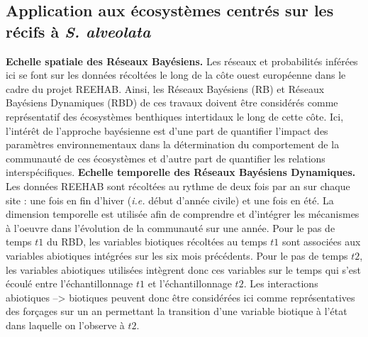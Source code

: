\documentclass[12pt]{report}
\begin{document}



        \subsection{Application aux écosystèmes centrés sur les récifs à \textit{S. alveolata}}

\textbf{Echelle spatiale des Réseaux Bayésiens.} Les réseaux et probabilités inférées ici se font sur les données récoltées le long de la côte ouest européenne dans le cadre du projet REEHAB. Ainsi, les Réseaux Bayésiens (RB) et Réseaux Bayésiens Dynamiques (RBD) de ces travaux doivent être considérés comme représentatif des écosystèmes benthiques intertidaux le long de cette côte. Ici, l'intérêt de l’approche bayésienne est d’une part de quantifier l'impact des paramètres environnementaux dans la détermination du comportement de la communauté de ces écosystèmes et d’autre part de quantifier les relations interspécifiques.
\newline \newline
\textbf{Echelle temporelle des Réseaux Bayésiens Dynamiques.} Les données REEHAB sont récoltées au rythme de deux fois par an sur chaque site : une fois en fin d’hiver (\textit{i.e.} début d’année civile) et une fois en été. La dimension temporelle est utilisée afin de comprendre et d'intégrer les mécanismes à l'oeuvre dans l'évolution de la communauté sur une année. Pour le pas de temps $t1$ du RBD, les variables biotiques récoltées au temps $t1$ sont associées aux variables abiotiques intégrées sur les six mois précédents. Pour le pas de temps $t2$, les variables abiotiques utilisées intègrent donc ces variables sur le temps qui s'est écoulé entre l'échantillonnage $t1$ et l'échantillonnage $t2$. Les interactions abiotiques --> biotiques peuvent donc être considérées ici comme représentatives des forçages sur un an permettant la transition d'une variable biotique à l'état dans laquelle on l'observe à $t2$.
\end{document}
